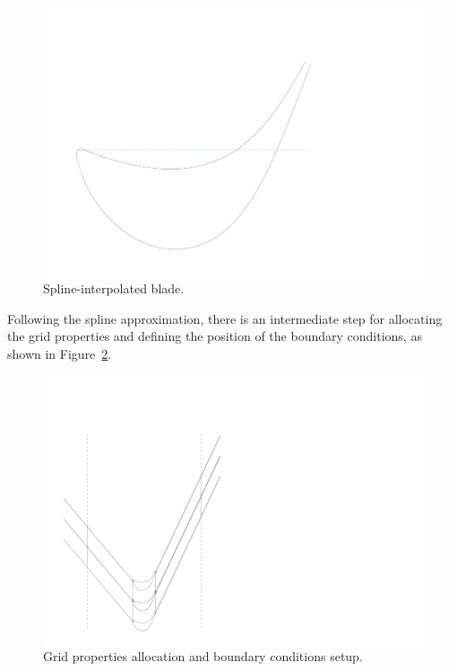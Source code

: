 \begin{figure}[!h]
    \centering
    \hspace*{2cm}
    \includegraphics[scale=0.4, trim=0cm 1.5cm 0cm 4cm, clip]{figures/datablade120-2.png}
    \caption{Spline-interpolated blade.}
    \label{fig:misesBlade}
\end{figure}

Following the spline approximation, there is an intermediate step for allocating the grid properties and defining the position of the boundary conditions, as shown in Figure~\ref{fig:misesBCs}.

\begin{figure}[H]
    \centering
    \hspace*{0.6cm}
    \includegraphics[scale=1, trim=0cm 0cm 0cm 2cm, clip]{figures/datablade120-1.png}
    \caption{Grid properties allocation and boundary conditions setup.}
    \label{fig:misesBCs}
\end{figure}

